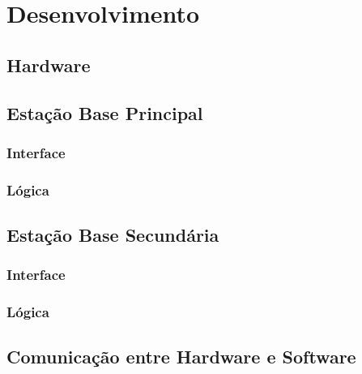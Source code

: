 
\chapter{Desenvolvimento}
\label{chap:desenvolvimento}



    \section{Hardware}



    \section{Estação Base Principal}



        \subsection{Interface}



        \subsection{Lógica}



    \section{Estação Base Secundária}



        \subsection{Interface}



        \subsection{Lógica}



    \section{Comunicação entre Hardware e Software}

